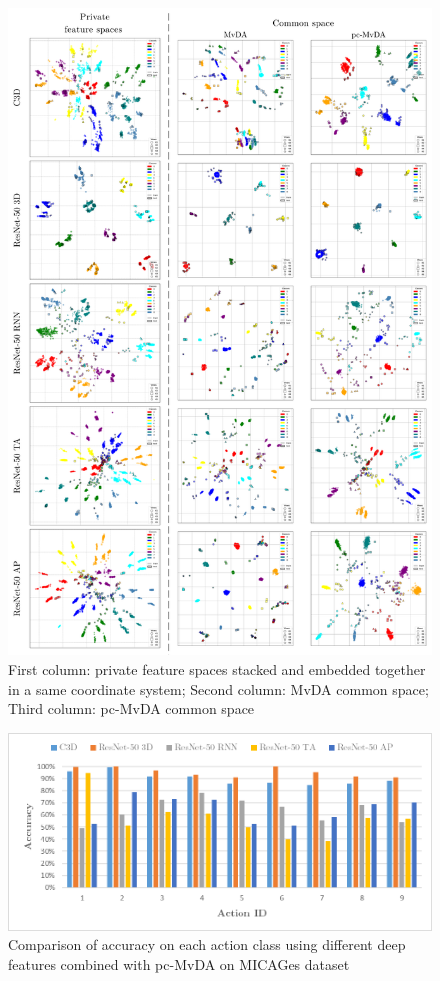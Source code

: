     \begin{figure}[htbp]
        \centering
        \includegraphics[width=1\linewidth, height=0.6\pdfpageheight, keepaspectratio=false]{figs/mica-tsne.png}
        \caption{First column: private feature spaces stacked and embedded together in a same coordinate system; Second column: MvDA common space; Third column: pc-MvDA common space}
        \label{fig:mica-tsne}
    \end{figure}

    \begin{figure}[htbp]
        \centering
        \includegraphics[width=0.8\linewidth]{figs/pc-MvDA_confusion_mica.png}
        \caption{Comparison of accuracy on each action class using different deep features combined with pc-MvDA on MICAGes dataset}
        \label{fig:pc-MvDA_confusion_mica}
    \end{figure}
